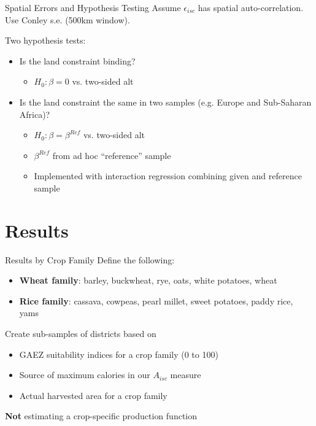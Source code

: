 \documentclass[10pt, xcolor=dvipsnames]{beamer}
\begin{document}
\begin{frame}{Spatial Errors and Hypothesis Testing}\label{testing}
Assume $\epsilon_{isc}$ has spatial auto-correlation. Use Conley s.e. (500km window). 

\vspace{.2cm} Two hypothesis tests:
\begin{itemize}
  \item Is the land constraint binding? 
    \begin{itemize}
      \item $H_0: \beta=0$ vs. two-sided alt 
    \end{itemize}
  \item Is the land constraint the same in two samples (e.g. Europe and Sub-Saharan Africa)? 
    \begin{itemize}
      \item $H_0: \beta = \beta^{Ref}$ vs. two-sided alt 
      \item $\beta^{Ref}$ from ad hoc ``reference'' sample
      \item Implemented with interaction regression combining given and reference sample
    \end{itemize}
\end{itemize}
\hfill \hyperlink{interaction}{}
\end{frame}

\section{Results}

\begin{frame}{Results by Crop Family}
Define the following:
\begin{itemize}
  \item \textbf{Wheat family}: barley, buckwheat, rye, oats, white potatoes, wheat
  \item \textbf{Rice family}: cassava, cowpeas, pearl millet, sweet potatoes, paddy rice, yams
\end{itemize}
Create sub-samples of districts based on 
\begin{itemize}
  \item GAEZ suitability indices for a crop family (0 to 100)
  \item Source of maximum calories in our $A_{isc}$ measure
  \item Actual harvested area for a crop family
\end{itemize}
\textbf{Not} estimating a crop-specific production function
\end{frame}
\end{document}
